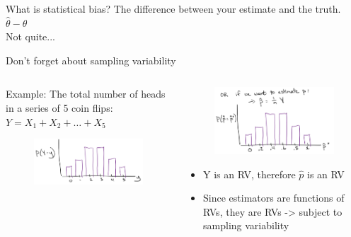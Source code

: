 \documentclass[aspectratio=169]{../latex_main/tntbeamer}  %
\begin{document}
	\begin{frame}[c]{What is statistical bias?}
	    \centering
	   The difference between your estimate and the truth.\\
        $\hat\theta - \theta$\\
        \bigskip
        Not quite...

	    
	\end{frame}
	
	
	\begin{frame}{Don’t forget about sampling variability}
	    \begin{columns}
	        \begin{column}{.4\textwidth}
	           Example: The total number of heads in a series of 5 coin flips: $Y = X_1 + X_2 + … + X_5$\\
	           \begin{figure}
	               \includegraphics[scale=.5]{Bild28}
	           \end{figure}
	        \end{column}
	        
	        \begin{column}{.5\textwidth}
	           \begin{figure}
	               \includegraphics[scale=.5]{Bild29}
	           \end{figure}
	           \begin{itemize}
	               \item Y is an RV, therefore $\hat{p}$ is an RV
	               \item Since estimators are functions of RVs, they are RVs -> subject to sampling variability
	           \end{itemize}
	        \end{column}
	        \end{columns}

	    
	\end{frame}
	
\end{document}
